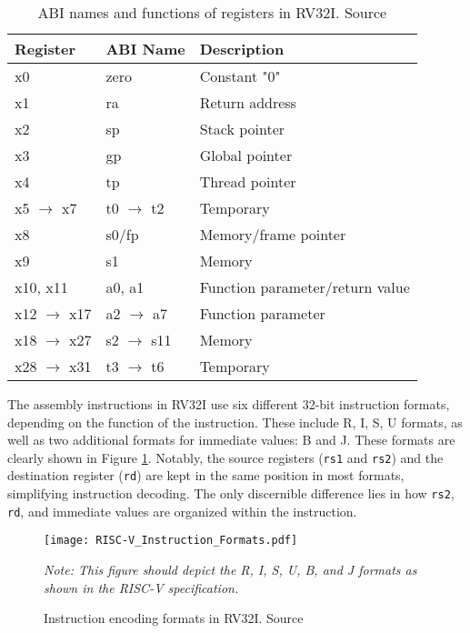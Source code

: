\begin{table}[h!]
    \centering
    \caption{ABI names and functions of registers in RV32I. Source \cite{waterman2014riscv}}
    \label{tab:rv32i_registers}
    \begin{tabular}{lll}
    \toprule
    Register & ABI Name & Description \\
    \midrule
    x0 & zero & Constant "0" \\
    x1 & ra & Return address \\
    x2 & sp & Stack pointer \\
    x3 & gp & Global pointer \\
    x4 & tp & Thread pointer \\
    x5 $\to$ x7 & t0 $\to$ t2 & Temporary \\
    x8 & s0/fp & Memory/frame pointer \\
    x9 & s1 & Memory \\
    x10, x11 & a0, a1 & Function parameter/return value \\
    x12 $\to$ x17 & a2 $\to$ a7 & Function parameter \\
    x18 $\to$ x27 & s2 $\to$ s11 & Memory \\
    x28 $\to$ x31 & t3 $\to$ t6 & Temporary \\
    \bottomrule
    \end{tabular}
\end{table}

The assembly instructions in RV32I use six different 32-bit instruction formats, depending on the function of the instruction. These include R, I, S, U formats, as well as two additional formats for immediate values: B and J. These formats are clearly shown in Figure \ref{fig:rv32i_formats}. Notably, the source registers (\texttt{rs1} and \texttt{rs2}) and the destination register (\texttt{rd}) are kept in the same position in most formats, simplifying instruction decoding. The only discernible difference lies in how \texttt{rs2}, \texttt{rd}, and immediate values are organized within the instruction.

\begin{figure}[h!]
    \centering
    \texttt{[image: RISC-V\_Instruction\_Formats.pdf]}
    \caption{Instruction encoding formats in RV32I. Source \cite{waterman2014riscv}}
    \label{fig:rv32i_formats}
    \textit{Note: This figure should depict the R, I, S, U, B, and J formats as shown in the RISC-V specification.}
\end{figure}

